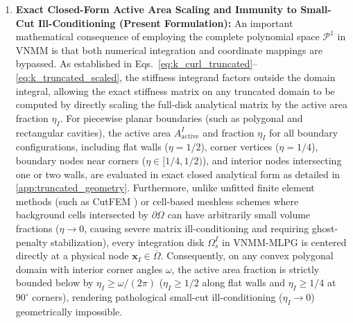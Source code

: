 \documentclass[VANCOUVER,Times1COL]{WileyNJD-v5}
\begin{document}
\begin{enumerate}
    \item \textbf{Exact Closed-Form Active Area Scaling and Immunity to Small-Cut Ill-Conditioning (Present Formulation):}
          An important mathematical consequence of employing the complete polynomial space $\mathcal{P}^1$ in VNMM is that both numerical integration and coordinate mappings are bypassed. As established in Eqs.~\eqref{eq:k_curl_truncated}--\eqref{eq:k_truncated_scaled}, the stiffness integrand factors outside the domain integral, allowing the exact stiffness matrix on any truncated domain to be computed by directly scaling the full-disk analytical matrix by the active area fraction $\eta_I$.
          For piecewise planar boundaries (such as polygonal and rectangular cavities), the active area $A_{\mathrm{active}}^I$ and fraction $\eta_I$ for all boundary configurations, including flat walls ($\eta = 1/2$), corner vertices ($\eta = 1/4$), boundary nodes near corners ($\eta \in [1/4, 1/2)$), and interior nodes intersecting one or two walls, are evaluated in exact closed analytical form as detailed in \ref{app:truncated_geometry}.
          Furthermore, unlike unfitted finite element methods (such as CutFEM \cite{hansbo2002unfitted}) or cell-based meshless schemes where background cells intersected by $\partial\Omega$ can have arbitrarily small volume fractions ($\eta \to 0$, causing severe matrix ill-conditioning and requiring ghost-penalty stabilization), every integration disk $\Omega_s^I$ in VNMM-MLPG is centered directly at a physical node $\mathbf{x}_I \in \overline{\Omega}$. Consequently, on any convex polygonal domain with interior corner angles $\omega$, the active area fraction is strictly bounded below by $\eta_I \ge \omega/(2\pi)$ ($\eta_I \ge 1/2$ along flat walls and $\eta_I \ge 1/4$ at $90^\circ$ corners), rendering pathological small-cut ill-conditioning ($\eta_I \to 0$) geometrically impossible.
\end{enumerate}
\end{document}
